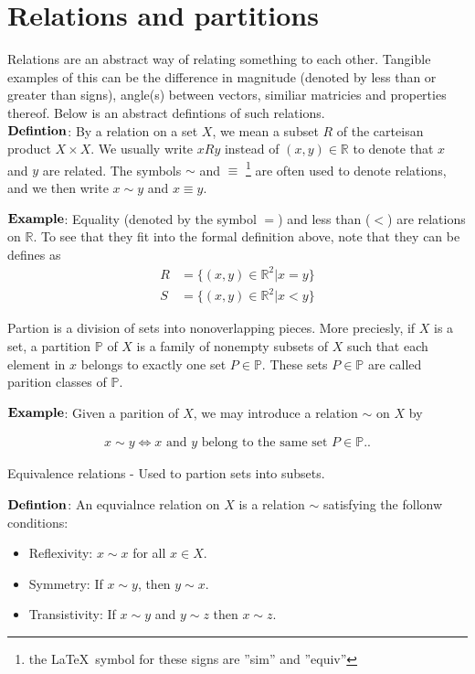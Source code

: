 \documentclass[12pt,letterpaper]{article}
\begin{document}
\section*{Relations and partitions}
Relations are an abstract way of relating something to each other. Tangible examples of this can be the difference in magnitude (denoted by less than or greater than signs), angle(s) between vectors, similiar matricies and properties thereof. Below is an abstract defintions of such relations. \\

\noindent
$\bold{Defintion}$: By a relation on a set $X$, we mean a subset $R$ of the carteisan product $X \times X$. We usually write $xRy$ instead of $(x,y) \in \mathbb{R}$ to denote that $x$ and $y$ are related. The symbols $\sim$ and $\equiv$  \footnote{the \LaTeX\  symbol for these signs are ''sim'' and ''equiv''} are often used to denote relations, and we then write $x\sim y$ and $x \equiv y$.

$\bold{Example}$: Equality (denoted by the symbol $=$) and less than ($<$)  are relations on $\mathbb{R}$. To see that they fit into the formal definition above, note that they can be defines as 
\begin{align*}
	R &= \{(x,y) \in \mathbb{R}^2 | x = y\} \\
	S &= \{(x,y) \in \mathbb{R}^2 | x < y\} 
\end{align*}

Partion is a division of sets into nonoverlapping pieces. More preciesly, if $X$ is a set, a partition $\mathbb{P}$ of $X$ is a family of nonempty subsets of $X$ such that each element in $x$ belongs to exactly one set $P \in \mathbb{P}$. These sets $P \in \mathbb{P}$ are called parition classes of $\mathbb{P}$. 

$\bold{Example}$:  Given a parition of $X$, we may introduce a relation $\sim$ on $X$ by

\begin{align*}
	x \sim y \Leftrightarrow x \text{ and } y \text{ belong to the same set $P \in \mathbb{P}$.}.
\end{align*}


\noindent  
Equivalence relations - Used to partion sets into subsets.

$\bold{Defintion}$: An equvialnce relation on $X$ is a relation $\sim$ satisfying the follonw conditions:
\begin{itemize}
	\item Reflexivity: $x\sim x$ for all $x\in X$.
	\item Symmetry: If $x\sim y$, then $y\sim x$.
	\item Transistivity: If $x\sim y$ and $y\sim z$ then $x\sim z$.
\end{itemize}
\end{document}
